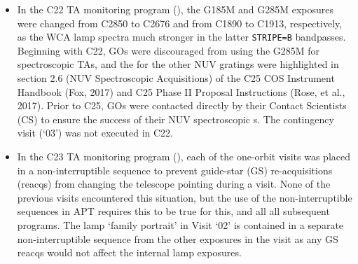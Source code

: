 \begin{itemize}
{The optional parameter \texttt{WAVECAL=YES} in the BOA$\times$MIRA target+Lamp image of the C20 program was discovered to not have taken the
expected internal lamp image in the \textsf{LC6601RYQ\_rawtag.fits} exposure. Correcting this inconsistency would have required significant APT, TRANS, and commanding changes.
As this internal calibration exposure combination is rarely executed, the C21 program included separate \texttt{TARGET=WAVE} companion lamp exposures for the target BOA exposure\footnote{The COS apertures are physically configured such that WCA light lands on the detector(s) when the PSA in place, but does not when the BOA is in place (INSERT REF). Therefore, whenever lamp images are required to verify BOA  exposures, the BOA is replaced by the PSA so that WCA light falls on the detector at the same location as it would fall for a PSA image.}
A second MIRA lamp image was added directly after the BOA$\times$MIRA , to verify the repeatability of the WCA lamp location when moving the BOA into and out of position.
To create time for the new exposures, the exposure times of the spectroscopic observations were scaled back, but still achieved the required S/N to measure the XD spectral locations.
}
\item{
In the C22 TA monitoring program (), the G185M and G285M exposures were changed from C2850 to C2676 and from C1890 to C1913, respectively, as the WCA lamp spectra much stronger in the latter \texttt{STRIPE=B} bandpasses. Beginning with C22, GOs were discouraged from using the G285M for spectroscopic  TAs,
and the \cenwaves{} for the other NUV gratings were highlighted in section 2.6 (NUV Spectroscopic Acquisitions) of the C25 COS Instrument Handbook (Fox, 2017) and C25 Phase II Proposal Instructions (Rose, et al., 2017). Prior to C25, GOs were contacted directly by their Contact Scientists (CS) to ensure the success of their NUV spectroscopic s.
The contingency visit (`03') was not executed in C22.
}
\item{
In the C23 TA monitoring program (), each of the one-orbit visits was placed in a non-interruptible sequence to prevent guide-star (GS) re-acquisitions (reacqs) from changing the telescope pointing during a visit.
None of the previous visits encountered this situation, but the use of the non-interruptible sequences in APT requires this to be true for this, and all all subsequent programs.
The lamp `family portrait' in Visit `02' is contained in a separate non-interruptible sequence from the other exposures in the visit as any GS reacqs would not affect the internal lamp exposures.
}
\end{itemize}
